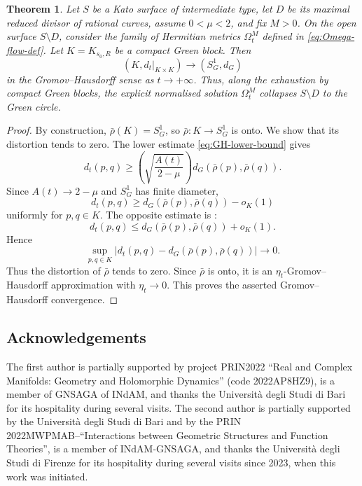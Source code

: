 \documentclass[12pt]{amsart}
\numberwithin{equation}{section}
\newtheorem{theorem}{Theorem}
\theoremstyle{remark}
\theoremstyle{definition}
\begin{document}
\begin{theorem}
\label{thm:green-exhaustive-GH}
Let $S$ be a Kato surface of intermediate type, let $D$ be its maximal reduced divisor of rational curves, assume $0<\mu<2$, and fix $M>0$. On the open surface $S\setminus D$, consider the family of Hermitian metrics $\Omega^M_t$ defined in \eqref{eq:Omega-flow-def}.
Let $K=K_{s_0,R}$ be a compact Green block. Then
\begin{equation*}
(K,d_t|_{K\times K})
\longrightarrow
(S^1_G,d_G)
\end{equation*}
in the Gromov--Hausdorff sense as $t\to+\infty$.  Thus, along the exhaustion by compact Green blocks, the explicit normalised solution $\Omega_t^M$ collapses $S\setminus D$ to the Green circle.
\end{theorem}

\begin{proof}
By construction, $\bar\rho(K)=S^1_G$, so $\bar\rho:K\to S^1_G$ is onto. We show that its distortion tends to zero.
The lower estimate \eqref{eq:GH-lower-bound} gives
$$
d_t(p,q)
\geq
\left(\sqrt{\frac{A(t)}{2-\mu}}\right)
d_G(\bar\rho(p),\bar\rho(q)).
$$
Since $A(t)\to2-\mu$ and $S^1_G$ has finite diameter,
$$
d_t(p,q)
\geq
d_G(\bar\rho(p),\bar\rho(q))-o_K(1)
$$
uniformly for $p,q\in K$. The opposite estimate is
:
$$
d_t(p,q)
\leq
d_G(\bar\rho(p),\bar\rho(q))+o_K(1).
$$
Hence
$$
\sup_{p,q\in K}
\left|
d_t(p,q)-d_G(\bar\rho(p),\bar\rho(q))
\right|
\longrightarrow0.
$$
Thus the distortion of $\bar\rho$ tends to zero. Since $\bar\rho$ is
onto, it is an $\eta_t$-Gromov--Hausdorff approximation with
$\eta_t\to0$. This proves the asserted Gromov--Hausdorff convergence.
\end{proof}



\subsection*{Acknowledgements}
 The first author is partially supported by project PRIN2022 ``Real and Complex Manifolds: Geometry and Holomorphic Dynamics'' (code 2022AP8HZ9), is a member of GNSAGA of INdAM, and thanks the Universit\`a degli Studi di Bari for its hospitality during several visits. The second author is partially supported by the Universit\`a degli Studi di Bari and by the PRIN 2022MWPMAB--``Interactions between Geometric Structures and Function Theories'', is a member of INdAM-GNSAGA, and thanks the Universit\`a degli Studi di Firenze for its hospitality during several visits since 2023, when this work was initiated.
\end{document}
